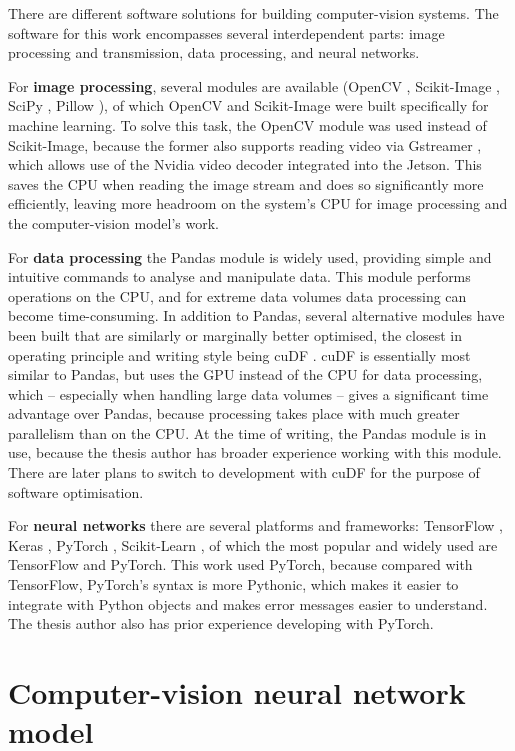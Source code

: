 
There are different software solutions for building computer-vision systems. The software for this work encompasses several interdependent parts: image processing and transmission, data processing, and neural networks.

For \textbf{image processing}, several modules are available (OpenCV \cite{ref36}, Scikit-Image \cite{ref37}, SciPy \cite{ref38}, Pillow \cite{ref39}), of which OpenCV and Scikit-Image were built specifically for machine learning. To solve this task, the OpenCV module was used instead of Scikit-Image, because the former also supports reading video via Gstreamer \cite{ref40}, which allows use of the Nvidia video decoder \cite{ref41} integrated into the Jetson. This saves the CPU when reading the image stream and does so significantly more efficiently, leaving more headroom on the system's CPU for image processing and the computer-vision model's work.

For \textbf{data processing} the Pandas \cite{ref42} module is widely used, providing simple and intuitive commands to analyse and manipulate data. This module performs operations on the CPU, and for extreme data volumes data processing can become time-consuming. In addition to Pandas, several alternative modules have been built that are similarly or marginally better optimised, the closest in operating principle and writing style being cuDF \cite{ref44}. cuDF is essentially most similar to Pandas, but uses the GPU instead of the CPU for data processing, which -- especially when handling large data volumes -- gives a significant time advantage over Pandas, because processing takes place with much greater parallelism than on the CPU. At the time of writing, the Pandas module is in use, because the thesis author has broader experience working with this module. There are later plans to switch to development with cuDF for the purpose of software optimisation.

For \textbf{neural networks} there are several platforms and frameworks: TensorFlow \cite{ref45}, Keras \cite{ref46}, PyTorch \cite{ref47}, Scikit-Learn \cite{ref48}, of which the most popular and widely used are TensorFlow and PyTorch. This work used PyTorch, because compared with TensorFlow, PyTorch's syntax is more Pythonic, which makes it easier to integrate with Python objects and makes error messages easier to understand. The thesis author also has prior experience developing with PyTorch.

\section{Computer-vision neural network model}\label{computer-vision-neural-network-model}

